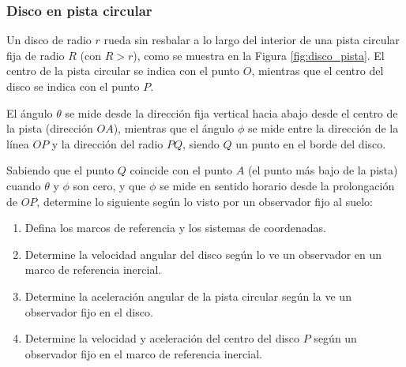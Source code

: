 \subsubsection{Disco en pista circular}

Un disco de radio $r$ rueda sin resbalar a lo largo del interior de una pista circular fija de radio $R$ (con $R > r$), como se muestra en la Figura \ref{fig:disco_pista}. El centro de la pista circular se indica con el punto $O$, mientras que el centro del disco se indica con el punto $P$. 

El ángulo $\theta$ se mide desde la dirección fija vertical hacia abajo desde el centro de la pista (dirección $OA$), mientras que el ángulo $\phi$ se mide entre la dirección de la línea $OP$ y la dirección del radio $PQ$, siendo $Q$ un punto en el borde del disco. 

Sabiendo que el punto $Q$ coincide con el punto $A$ (el punto más bajo de la pista) cuando $\theta$ y $\phi$ son cero, y que $\phi$ se mide en sentido horario desde la prolongación de $OP$, determine lo siguiente según lo visto por un observador fijo al suelo:

\begin{enumerate}
    \item Defina los marcos de referencia y los sistemas de coordenadas.
    \item Determine la velocidad angular del disco según lo ve un observador en un marco de referencia inercial.
    \item Determine la aceleración angular de la pista circular según la ve un observador fijo en el disco.
    \item Determine la velocidad y aceleración del centro del disco $P$ según un observador fijo en el marco de referencia inercial.
\end{enumerate}

